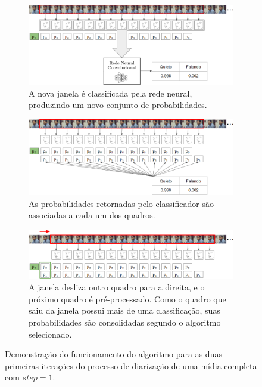 \begin{figure}[ht]\ContinuedFloat
    \centering
    \begin{subfigure}[b]{\textwidth}
        \includegraphics[width=\textwidth]{figures/alg_demo_9.png}
        \caption{A nova janela é classificada pela rede neural, produzindo um novo conjunto de probabilidades.}
    \end{subfigure}
    \newline
    \newline
    \newline
    \begin{subfigure}[b]{\textwidth}
        \includegraphics[width=\textwidth]{figures/alg_demo_10.png}
        \caption{As probabilidades retornadas pelo classificador são associadas a cada um dos quadros.}
    \end{subfigure}
    \begin{subfigure}[b]{\textwidth}
        \includegraphics[width=\textwidth]{figures/alg_demo_12.png}
        \caption{A janela desliza outro quadro para a direita, e o próximo quadro é pré-processado. Como o quadro que saiu da janela possui mais de uma classificação, suas probabilidades são consolidadas segundo o algoritmo selecionado.}
    \end{subfigure}
    \caption{Demonstração do funcionamento do algoritmo para as duas primeiras iterações do processo de diarização de uma mídia completa com $step = 1$.}
    \label{fig:alg_demo}
\end{figure}

